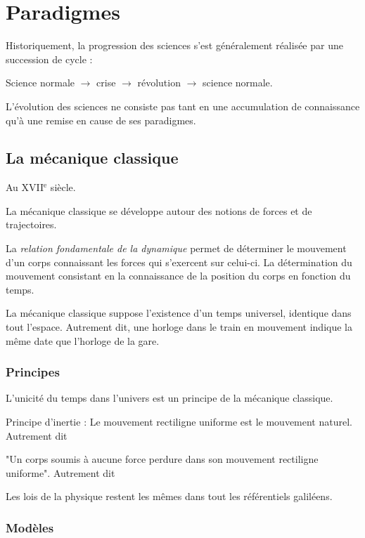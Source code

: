 
\section{Paradigmes}

Historiquement, la progression des sciences s'est généralement réalisée par une succession de cycle :
\begin{center}
Science normale $\to$ crise $\to$ révolution $\to$ science normale.
\end{center}
L'évolution des sciences ne consiste pas tant en une accumulation de connaissance qu'à une remise en cause de ses paradigmes.


  \subsection{La mécanique classique}

Au {\footnotesize XVII}$^\text{e}$ siècle.

La mécanique classique se développe autour des notions de forces et de trajectoires.

La {\it relation fondamentale de la dynamique} permet de déterminer le mouvement d'un corps connaissant les forces qui s'exercent sur celui-ci. La détermination du mouvement consistant en la connaissance de la position du corps en fonction du temps. 

La mécanique classique suppose l'existence d'un temps universel, identique dans tout l'espace. Autrement dit, une horloge dans le train en mouvement indique la même date que l'horloge de la gare.


  \subsubsection{Principes}

L'unicité du temps dans l'univers est un principe de la mécanique classique.

Principe d'inertie : Le mouvement rectiligne uniforme est le mouvement naturel. Autrement dit

"Un corps soumis à aucune force perdure dans son mouvement rectiligne uniforme". Autrement dit

Les lois de la physique restent les mêmes dans tout les référentiels galiléens.

  \subsubsection{Modèles}

